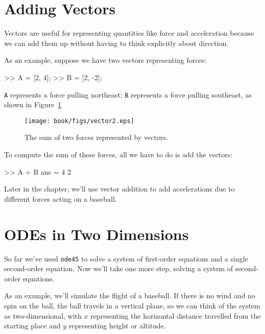 
\section{Adding Vectors}

Vectors are useful for representing quantities like force and acceleration because we can add them up without having to think explicitly about direction.


As an example, suppose we have two vectors representing forces:

\begin{code}
>> A = [2, 4];
>> B = [2, -2];
\end{code}

{\tt A} represents a force pulling northeast; {\tt B} represents a force pulling southeast, as shown in Figure~\ref{fig:vector2}

\begin{figure}[ht]
\centerline{\texttt{[image: book/figs/vector2.eps]}}
\caption{The sum of two forces represented by vectors.}
\label{fig:vector2}
\end{figure}

To compute the sum of these forces, all we have to do is add the vectors:

\begin{code}
>> A + B
ans = 4     2
\end{code}

Later in the chapter, we'll use vector addition to add accelerations due to different forces acting on a baseball.


\section{ODEs in Two Dimensions}
\label{projectile}

So far we've used {\tt ode45} to solve a system of first-order equations and a single second-order equation.  Now we'll take one more step, solving a system of second-order equations.

As an example, we'll simulate the flight of a baseball.
If there is no wind and no spin on the ball, the ball travels in a vertical plane, so we can think of the system as two-dimensional, with $x$ representing the horizontal distance
travelled from the starting place and $y$ representing height or altitude.


